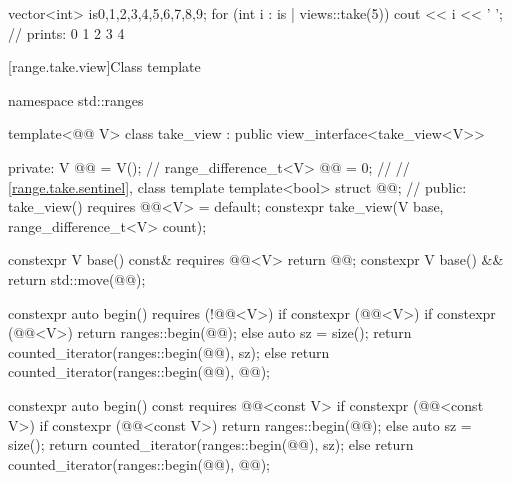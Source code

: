 \pnum
\begin{example}
\begin{codeblock}
vector<int> is{0,1,2,3,4,5,6,7,8,9};
for (int i : is | views::take(5))
  cout << i << ' '; // prints: 0 1 2 3 4
\end{codeblock}
\end{example}

[range.take.view]{Class template }

%
%
%
%
%
\begin{codeblock}
namespace std::ranges {
  template<@@ V>
  class take_view : public view_interface<take_view<V>> {
  private:
    V @@ = V();                                      // \expos
    range_difference_t<V> @@ = 0;                   // \expos
    // \ref{range.take.sentinel}, class template 
    template<bool> struct @@;                     // \expos
  public:
    take_view() requires @@<V> = default;
    constexpr take_view(V base, range_difference_t<V> count);

    constexpr V base() const& requires @@<V> { return @@; }
    constexpr V base() && { return std::move(@@); }

    constexpr auto begin() requires (!@@<V>) {
      if constexpr (@@<V>) {
        if constexpr (@@<V>)
          return ranges::begin(@@);
        else {
          auto sz = size();
          return counted_iterator(ranges::begin(@@), sz);
        }
      } else
        return counted_iterator(ranges::begin(@@), @@);
    }

    constexpr auto begin() const requires @@<const V> {
      if constexpr (@@<const V>) {
        if constexpr (@@<const V>)
          return ranges::begin(@@);
        else {
          auto sz = size();
          return counted_iterator(ranges::begin(@@), sz);
        }
      } else
        return counted_iterator(ranges::begin(@@), @@);
    }

}}
\end{codeblock}

